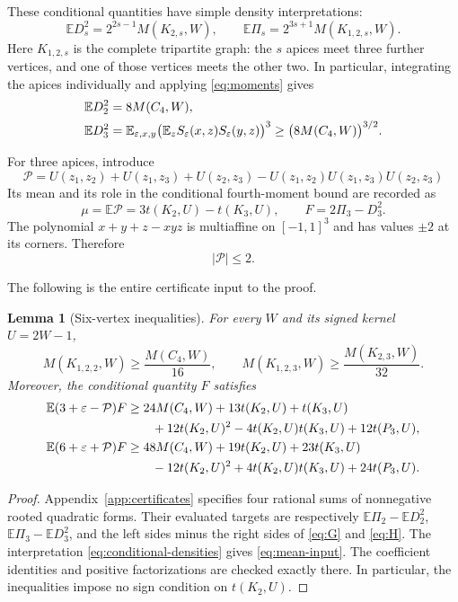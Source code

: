 \documentclass[11pt,a4paper]{article}
\newtheorem{lemma}[theorem]{Lemma}
\theoremstyle{remark}
\numberwithin{equation}{section}
\newcommand{\E}{\mathbb E}
\newcommand{\maj}{\mathcal P}
\begin{document}
These conditional quantities have simple density interpretations:
\begin{equation}\label{eq:conditional-densities}
 \E D_s^2=2^{2s-1}M(K_{2,s},W),\qquad
 \E\Pi_s=2^{3s+1}M(K_{1,2,s},W).
\end{equation}
Here $K_{1,2,s}$ is the complete tripartite graph: the $s$ apices
meet three further vertices, and one of those vertices meets the
other two. In particular, integrating the apices individually and
applying \eqref{eq:moments} gives
\begin{align}
 \E D_2^2&=8M(C_4,W),\notag\\
 \E D_3^2
 &=\E_{\varepsilon,x,y}
     \bigl(\E_zS_\varepsilon(x,z)S_\varepsilon(y,z)\bigr)^3
 \geq\bigl(8M(C_4,W)\bigr)^{3/2}.
 \label{eq:codegree}
\end{align}

For three apices, introduce
\begin{equation}\label{eq:majority}
 \maj=U(z_1,z_2)+U(z_1,z_3)+U(z_2,z_3)
                  -U(z_1,z_2)U(z_1,z_3)U(z_2,z_3)
\end{equation}
Its mean and its role in the conditional fourth-moment bound are
recorded as
\[
 \mu=\E\maj=3t(K_2,U)-t(K_3,U),\qquad F=2\Pi_3-D_3^2.
\]
The polynomial $x+y+z-xyz$ is multiaffine on $[-1,1]^3$ and has
values $\pm2$ at its corners. Therefore
\begin{equation}\label{eq:majority-bounds}
 |\maj|\leq2.
\end{equation}

The following is the entire certificate input to the proof.

\begin{lemma}[Six-vertex inequalities]\label{lem:cert-input}
For every $W$ and its signed kernel $U=2W-1$,
\begin{equation}\label{eq:mean-input}
 M(K_{1,2,2},W)\geq\frac{M(C_4,W)}{16},\qquad
 M(K_{1,2,3},W)\geq\frac{M(K_{2,3},W)}{32}.
\end{equation}
Moreover, the conditional quantity $F$ satisfies
\begin{align}
 \E(3+\varepsilon-\maj)F
 &\geq24M(C_4,W)+13t(K_2,U)+t(K_3,U)\notag\\
 &\qquad+12t(K_2,U)^2-4t(K_2,U)t(K_3,U)+12t(P_3,U),
 \label{eq:G}\\
 \E(6+\varepsilon+\maj)F
 &\geq48M(C_4,W)+19t(K_2,U)+23t(K_3,U)\notag\\
 &\qquad-12t(K_2,U)^2+4t(K_2,U)t(K_3,U)+24t(P_3,U).
 \label{eq:H}
\end{align}
\end{lemma}
\begin{proof}
Appendix~\ref{app:certificates} specifies four rational sums of
nonnegative rooted quadratic forms. Their evaluated targets are
respectively $\E\Pi_2-\E D_2^2$, $\E\Pi_3-\E D_3^2$, and
the left sides minus the right sides of \eqref{eq:G} and
\eqref{eq:H}. The interpretation
\eqref{eq:conditional-densities} gives \eqref{eq:mean-input}.
The coefficient identities and positive factorizations are checked
exactly there. In particular, the inequalities impose no sign
condition on $t(K_2,U)$.
\end{proof}
\end{document}
